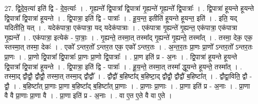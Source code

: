 \documentclass[17pt]{extarticle}
\begin{document}
27. द्वि॒दे॒व॒त्या॑ इति॑ द्वि - दे॒व॒त्याः᳚ । . गृ॒ह्यन्ते᳚ द्वि॒पात्रा᳚ द्वि॒पात्रा॑ गृ॒ह्यन्ते॑ गृ॒ह्यन्ते᳚ द्वि॒पात्राः᳚ । . द्वि॒पात्रा॑ हूयन्ते हूयन्ते द्वि॒पात्रा᳚ द्वि॒पात्रा॑ हूयन्ते । . द्वि॒पात्रा॒ इति॑ द्वि - पात्राः᳚ । . हू॒य॒न्त॒ इतीति॑ हूयन्ते हूयन्त॒ इति॑ । . इति॒ यद् यदितीति॒ यत् । . यदेक॑पात्रा॒ एक॑पात्रा॒ यद् यदेक॑पात्राः । . एक॑पात्रा गृ॒ह्यन्ते॑ गृ॒ह्यन्त॒ एक॑पात्रा॒ एक॑पात्रा गृ॒ह्यन्ते᳚ । . एक॑पात्रा॒ इत्येक॑ - पा॒त्राः॒ । . गृ॒ह्यन्ते॒ तस्मा॒त् तस्मा᳚द् गृ॒ह्यन्ते॑ गृ॒ह्यन्ते॒ तस्मा᳚त् । . तस्मा॒ देक॒ एक॒ स्तस्मा॒त् तस्मा॒ देकः॑ । . एको᳚ ऽन्तर॒तो᳚ ऽन्तर॒त एक॒ एको᳚ ऽन्तर॒तः । . अ॒न्त॒र॒तः प्रा॒णः प्रा॒णो᳚ ऽन्तर॒तो᳚ ऽन्तर॒तः प्रा॒णः । . प्रा॒णो द्वि॒पात्रा᳚ द्वि॒पात्राः᳚ प्रा॒णः प्रा॒णो द्वि॒पात्राः᳚ । . प्रा॒ण इति॑ प्र - अ॒नः । . द्वि॒पात्रा॑ हूयन्ते हूयन्ते द्वि॒पात्रा᳚ द्वि॒पात्रा॑ हूयन्ते । . द्वि॒पात्रा॒ इति॑ द्वि - पात्राः᳚ । . हू॒य॒न्ते॒ तस्मा॒त् तस्मा᳚ द्धूयन्ते हूयन्ते॒ तस्मा᳚त् । . तस्मा॒द् द्वौद्वौ॒ द्वौद्वौ॒ तस्मा॒त् तस्मा॒द् द्वौद्वौ᳚ । . द्वौद्वौ॑ ब॒हिष्टा᳚द् ब॒हिष्टा॒द् द्वौद्वौ॒ द्वौद्वौ॑ ब॒हिष्टा᳚त् । . द्वौद्वा॒विति॒ द्वौ - द्वौ॒ । . ब॒हिष्टा᳚त् प्रा॒णाः प्रा॒णा ब॒हिष्टा᳚द् ब॒हिष्टा᳚त् प्रा॒णाः । . प्रा॒णाः प्रा॒णाः । . प्रा॒णा इति॑ प्र - अ॒नाः । . प्रा॒णा वै वै प्रा॒णाः प्रा॒णा वै । . प्रा॒णा इति॑ प्र - अ॒नाः । . वा ए॒त ए॒ते वै वा ए॒ते । \newline
\end{document}
